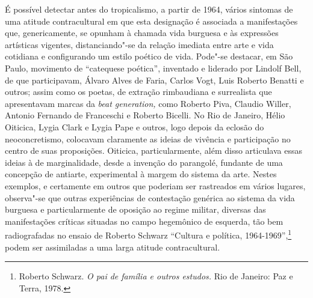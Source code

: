 \asterisc

É possível detectar antes do tropicalismo, a partir de 1964, vários
sintomas de uma atitude contracultural em que esta designação é
associada a manifestações que, genericamente, se opunham à chamada vida
burguesa e às expressões artísticas vigentes, distanciando"-se da relação
imediata entre arte e vida cotidiana e configurando um estilo poético de
vida. Pode"-se destacar, em São Paulo, movimento de ``catequese
poética'', inventado e liderado por Lindolf Bell, de que participavam,
Álvaro Alves de Faria, Carlos Vogt, Luis Roberto Benatti e outros; assim
como os poetas, de extração rimbaudiana e surrealista que apresentavam
marcas da \emph{beat generation,} como Roberto Piva, Claudio Willer,
Antonio Fernando de Franceschi e Roberto Bicelli. No Rio de Janeiro,
Hélio Oiticica, Lygia Clark e Lygia Pape e outros, logo depois da
eclosão do neoconcretismo, colocavam claramente as ideias de vivência e
participação no centro de suas proposições. Oiticica, particularmente,
além disso articulava essas ideias à de marginalidade, desde a invenção
do parangolé, fundante de uma concepção de antiarte, experimental à
margem do sistema da arte. Nestes exemplos, e certamente em outros que
poderiam ser rastreados em vários lugares, observa"-se que outras
experiências de contestação genérica ao sistema da vida burguesa e
particularmente de oposição ao regime militar, diversas das
manifestações críticas situadas no campo hegemônico de esquerda, tão bem
radiografadas no ensaio de Roberto Schwarz ``Cultura e política,
1964-1969'',\footnote{Roberto Schwarz. \emph{O pai de família e outros
  estudos.} Rio de Janeiro: Paz e Terra, 1978.} podem ser assimiladas a
uma larga atitude contracultural.

